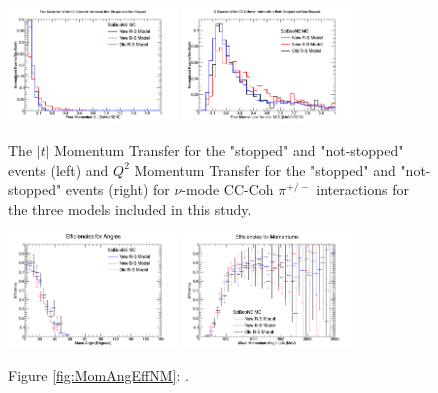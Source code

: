 \documentclass[11pt]{article}
\begin{document}
\begin{figure}[H]
\centering
\includegraphics[width=0.4\textwidth]{CCCohPlots/NMCCCohGoodT.png}
\includegraphics[width=0.4\textwidth]{CCCohPlots/NMCCCohGoodQ2.png}
\caption{The $|t|$ Momentum Transfer for the "stopped" and "not-stopped" events (left) and $Q^2$ Momentum Transfer for the "stopped" and "not-stopped" events (right) for $\nu$-mode CC-Coh $\pi^{+/-}$ interactions for the three models included in this study.}
\end{figure}\label{fig:AntiNuModeCCCohGoodTAndQ2}




\begin{figure}[H]
\centering
\includegraphics[width=0.4\textwidth]{NMCombinedPlotsImages/24-NMCombinedPlots.png}
\includegraphics[width=0.4\textwidth]{NMCombinedPlotsImages/25-NMCombinedPlots.png}
\caption*{Figure \ref*{fig:MomAngEffNM}: .}
\end{figure}\label{fig:MomAngEffNM}
\end{document}
